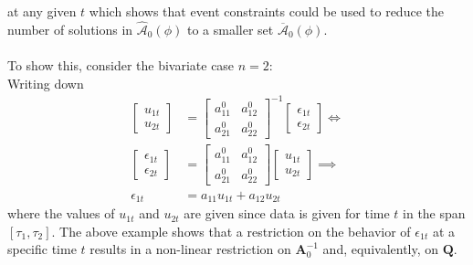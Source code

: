 \documentclass[a4paper,11pt,listof=nochaptergap,oneside,pointednumbers,bibtotoc,bigheadings,liststotoc,hidelinks]{scrbook}
\theoremstyle{mysatz}
\theoremstyle{mydefinition}
\theoremstyle{mytheorem}
\theoremstyle{mybemerkung}
\let\oldhat\hat
\newcommand{\vect}[1]{\boldsymbol{\mathbf{#1}}}
\newcommand{\hatt}[1]{\oldhat{\boldsymbol{\mathbf{#1}}}}
\begin{document}
at any given $t$ which shows that event constraints could be used to reduce the number of solutions in $\hatt{\mathcal{A}}_0(\phi)$ to a smaller set $\overline{\vect{\mathcal{A}}}_0(\phi)$. \\
\\
To show this, \citet{ludvigsonetal:18} consider the bivariate case $n=2$:\\
Writing down
\begin{equation} \label{eq:svar_ludvi11}
\begin{split}
	\begin{bmatrix}
    		u_{1t} \\
		u_{2t}
 		\end{bmatrix} & = 
		\begin{bmatrix}
    			a_{11}^0 &  a_{12}^0 \\
			a_{21}^0 &  a_{22}^0
 			\end{bmatrix}^{-1}
			\begin{bmatrix}
    				\epsilon_{1t} \\
				\epsilon_{2t}
 				\end{bmatrix}  \iff \\
	\begin{bmatrix}
    		\epsilon_{1t} \\
		\epsilon_{2t}
 		\end{bmatrix} & = 
		\begin{bmatrix}
    			a_{11}^0 &  a_{12}^0 \\
			a_{21}^0 &  a_{22}^0
 			\end{bmatrix}
			\begin{bmatrix}
    				u_{1t} \\
				u_{2t}
 				\end{bmatrix} \implies \\
				\epsilon_{1t} & = a_{11}u_{1t} + a_{12}u_{2t}
\end{split}								
\end{equation}
where the values of $u_{1t}$ and $u_{2t}$ are given since data is given for time $t$ in the span $[\tau_1, \tau_2]$. The above example shows that a restriction on the behavior of $\epsilon_{1t}$ at a specific time $t$ results in a non-linear restriction on $\vect{A}_0^{-1}$ and, equivalently, on $\vect{Q}$.
\\
\\
\end{document}
